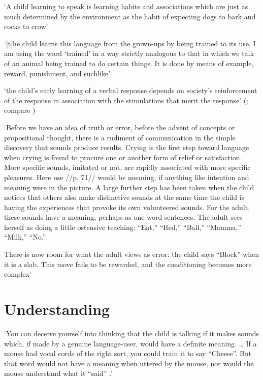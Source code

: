 \documentclass[12pt]{extarticle}
\begin{document}
\begin{multicols}{3}
‘A child learning to speak is learning habits and associations which are just as much determined by the environment as the habit of expecting dogs to bark and cocks to crow’
\citep[p.\ 71]{Russell:1921ww}
 
‘[t]he child learns this language from the grown-ups by being trained to its use. I am using the word ‘trained’ in a way strictly analogous to that in which we talk of an animal being trained to do certain things. It is done by means of example, reward, punishment, and suchlike’
\citep[p.\ 77]{Wittgenstein:1972lj}
 
‘the child’s early learning of a verbal response depends on society's reinforcement of the response in association with the stimulations that merit the response’
(\citep[p.\ 82]{Quine:1960fe}; compare \citep[pp.\ 28--9]{Quine:1974rd})
 
‘Before we have an idea of truth or error, before the advent of concepts or propositional thought,
there is a rudiment of communication in the simple discovery that sounds produce results. Crying is the first step toward language when crying is found to procure one or another form of relief or satisfaction. More specific sounds, imitated or not, are rapidly associated with more specific pleasures.
Here use //p. 71// would be meaning, if anything like intention and meaning were in the picture.
A large further step has been taken when the child notices that others also make distinctive sounds at the same time the child is having the experiences that provoke its own volunteered sounds.
For the adult, these sounds have a meaning, perhaps as one word sentences. The adult sees herself as doing a little ostensive teaching: “Eat,” “Red,” “Ball,” “Mamma,” “Milk,” “No.”
 
There is now room for what the adult views as error: the child says “Block” when it is a slab. This move fails to be rewarded, and the conditioning becomes more complex’
\citep[pp.\ 70--1]{Davidson:2000mt}
 
 
 
\section{Understanding}
 
‘You can deceive yourself into thinking that the child is talking if it makes sounds which, if made by a genuine language-user, would have a definite meaning.
… If a mouse had vocal cords of the right sort, you could train it to say “Cheese”. But that word would not have a meaning when uttered by the mouse,
nor would the mouse understand what it “said”
.’
\citep[p.\ 11]{Davidson:1999ju}
 

\end{multicols}
\end{document}
